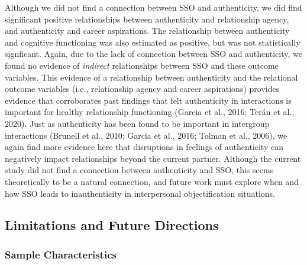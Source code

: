 \documentclass[man]{apa6}
\begin{document}
Although we did not find a connection between SSO and authenticity, we
did find significant positive relationships between authenticity and
relationship agency, and authenticity and career aspirations. The
relationship between authenticity and cognitive functioning was also
estimated as positive, but was not statistically signficant. Again, due
to the lack of connection between SSO and authenticity, we found no
evidence of \emph{indirect} relationships between SSO and these outcome
variables. This evidence of a relationship between authenticity and the
relational outcome variables (i.e., relationship agency and career
aspirations) provides evidence that corroborates past findings that felt
authenticity in interactions is important for healthy relationship
functioning (Garcia et al., 2016; Terán et al., 2020). Just as
authenticity has been found to be important in intergroup interactions
(Brunell et al., 2010; Garcia et al., 2016; Tolman et al., 2006), we
again find more evidence here that disruptions in feelings of
authenticity can negatively impact relationships beyond the current
partner. Although the current study did not find a connection between
authenticity and SSO, this seems theoretically to be a natural
connection, and future work must explore when and how SSO leads to
inauthenticity in interpersonal objectification situations.

\subsection{Limitations and Future
Directions}\label{limitations-and-future-directions}

\subsubsection{Sample Characteristics}\label{sample-characteristics}
\end{document}
